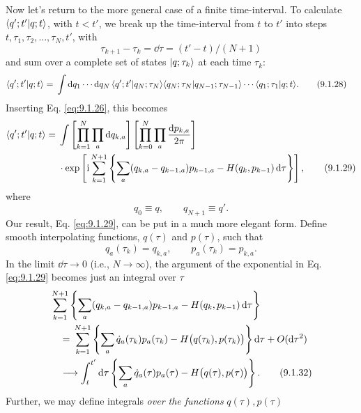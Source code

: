 Now let's return to the more general case of a finite time-interval. To
calculate $\langle q';t' | q;t\rangle$, with $t<t'$, we break up the time-interval
from $t$ to $t'$ into steps $t,\tau_1,\tau_2,\ldots,\tau_N,t'$, with
\begin{equation}
  \tau_{k+1}-\tau_k=\dd\tau=(t'-t)/(N+1)
  \tag{9.1.27}\label{eq:9.1.27}
\end{equation}
and sum over a complete set of states $\lvert q;\tau_k\rangle$ at each time
$\tau_k$:
\begin{align}
  \langle q';t' | q;t\rangle
  ={}&\int \mathop{}\!\mathrm{d} q_1\cdots \mathop{}\!\mathrm{d} q_N\,\langle q';t' | q_N;\tau_N\rangle
  \langle q_N;\tau_N | q_{N-1};\tau_{N-1}\rangle\cdots
  \langle q_1;\tau_1 | q;t\rangle.
  \tag{9.1.28}\label{eq:9.1.28}
\end{align}
Inserting Eq. \eqref{eq:9.1.26}, this becomes
\begin{align}
  \langle q';t' | q;t\rangle
  ={}&\int
  \left[\prod_{k=1}^{N}\prod_a \mathop{}\!\mathrm{d} q_{k,a}\right]
  \left[\prod_{k=0}^{N}\prod_a\frac{\mathop{}\!\mathrm{d} p_{k,a}}{2\pi}\right]\notag \\
  &\cdot \exp\left[\mathrm{i}\sum_{k=1}^{N+1}
  \left\{\sum_a(q_{k,a}-q_{k-1,a})p_{k-1,a}
  -H(q_k,p_{k-1})\mathop{}\!\mathrm{d}\tau\right\}\right],
  \tag{9.1.29}\label{eq:9.1.29}
\end{align}
where
\begin{equation}
  q_0\equiv q,
  \qquad
  q_{N+1}\equiv q'.
  \tag{9.1.30}\label{eq:9.1.30}
\end{equation}
Our result, Eq. \eqref{eq:9.1.29}, can be put in a much more elegant form. Define
smooth interpolating functions, $q(\tau)$ and $p(\tau)$, such that
\begin{equation}
  q_a(\tau_k)=q_{k,a},
  \qquad
  p_a(\tau_k)=p_{k,a}.
  \tag{9.1.31}\label{eq:9.1.31}
\end{equation}
In the limit $\dd\tau\to0$ (i.e., $N\to\infty$), the argument of the
exponential in Eq. \eqref{eq:9.1.29} becomes just an integral over $\tau$
\begin{align}
  &\sum_{k=1}^{N+1}\left\{\sum_a(q_{k,a}-q_{k-1,a})p_{k-1,a}
  -H(q_k,p_{k-1})\mathop{}\!\mathrm{d}\tau\right\}
  \notag\\
  &\quad={}
  \sum_{k=1}^{N+1}\left\{\sum_a\dot q_a(\tau_k)p_a(\tau_k)
  -H\bigl(q(\tau_k),p(\tau_k)\bigr)\right\}\mathop{}\!\mathrm{d}\tau+O(\mathop{}\!\mathrm{d}\tau^2)
  \notag\\
  &\quad\longrightarrow
  \int_t^{t'}\mathop{}\!\mathrm{d}\tau\left\{\sum_a\dot q_a(\tau)p_a(\tau)
  -H\bigl(q(\tau),p(\tau)\bigr)\right\}.
  \tag{9.1.32}\label{eq:9.1.32}
\end{align}
Further, we may define integrals \emph{over the functions} $q(\tau),p(\tau)$
